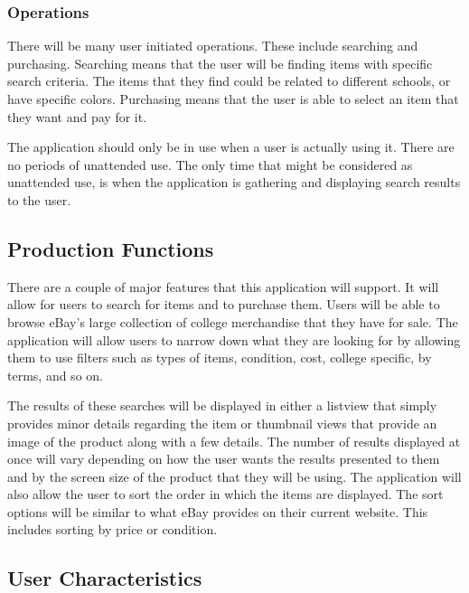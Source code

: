 \documentclass[journal,compsoc, 10pt, draftclsnofoot, onecolumn]{IEEEtran}
\begin{document}
\subsubsection{Operations}

There will be many user initiated operations. These include searching and 
purchasing. Searching means that the user will be finding items with specific 
search criteria. The items that they find could be related to different schools,
 or have specific colors. Purchasing means that the user is able to select an 
item that they want and pay for it.\newline

The application should only be in use when a user is actually using it. There 
are no periods of unattended use. The only time that might be considered as 
unattended use, is when the application is gathering and displaying search 
results to the user. 

\subsection{Production Functions}

There are a couple of major features that this application will support. It will
 allow for users to search for items and to purchase them. Users will be able 
to browse eBay's large collection of college merchandise that they have for 
sale. The application will allow users to narrow down what they are looking for 
by allowing them to use filters such as types of items, condition, cost, college
 specific, by terms, and so on. \newline

The results of these searches will be displayed in either a listview that simply
 provides minor details regarding the item or thumbnail views that provide an 
image of the product along with a few details. The number of results displayed 
at once will vary depending on how the user wants the results presented to them 
and by the screen size of the product that they will be using. The application 
will also allow the user to sort the order in which the items are displayed. The
 sort options will be similar to what eBay provides on their current website. 
This includes sorting by price or condition.

\subsection{User Characteristics}
\end{document}
